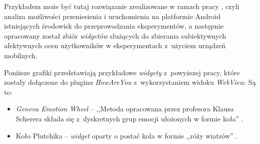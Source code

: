 \begin{itemize}
	Przykładem może być tutaj rozwiązanie zrealizowane w ramach pracy \cite{ArkadiuszLis}, czyli analiza możliwości przeniesienia i uruchomienia na platformie Android istniejących środowisk do przeprowadzania eksperymentów, a następnie	opracowany został zbiór \textit{widgetów} służących do zbierania subiektywnych afektywnych ocen użytkowników w eksperymentach z~użyciem urządzeń mobilnych.
	
	Poniższe grafiki przedstawiają przykładowe \textit{widgety} z~powyższej pracy, które zostały dołączone do pluginu \textit{HowAreYou} z~wykorzystaniem widoku \textit{WebView}. Są to:
	
	\begin{itemize}
		\item \textit{Geneva Emotion Wheel} -- ,,Metoda opracowana przez profesora Klausa Scherera składa się z~dyskretnych grup emocji ułożonych w formie koła'' \cite{ArkadiuszLis}.
		
		\item Koło Plutchika -- \textit{widget} oparty o postać koła w formie ,,róży wiatrów'' \cite{ArkadiuszLis}.
	\end{itemize}
	

\end{itemize}
